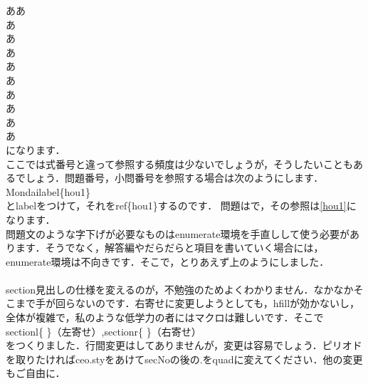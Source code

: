 \documentclass [10pt,fleqn,b5paper]{jsarticlek}
\begin{document}
\Mondai ああ\\
\Katakana あ\\
\Katakana あ\\
\Shikaku あ\\
\Shikakub あ\\
\Kuro あ\\
\Tokeiko あ\\
\Tokeidai あ\\
\Kakukakko あ\\
\Kakukakkob あ\\
になります．\\
ここでは式番号と違って参照する頻度は少ないでしょうが，そうしたいこともあるでしょう．問題番号，小問番号を参照する場合は次のようにします．\\
\yy Mondai\Kl \yy label\{hou1\}\Kr\\
とlabelをつけて，それを\yy ref\{hou1\}するのです．
問題は\Mondai[\label{hou1}]で，その参照は\ref{hou1}になります．\\

問題文のような字下げが必要なものはenumerate環境を手直しして使う必要があります．そうでなく，解答編やだらだらと項目を書いていく場合には，enumerate環境は不向きです．そこで，とりあえず上のようにしました．
\\
\\
section見出しの仕様を変えるのが，不勉強のためよくわかりません．なかなかそこまで手が回らないのです．右寄せに変更しようとしても，hfillが効かないし，全体が複雑で，私のような低学力の者にはマクロは難しいです．そこで\\
sectionl\{ \}（左寄せ）,sectionr\{ \}（右寄せ）\\
をつくりました．行間変更はしてありませんが，変更は容易でしょう．ピリオドを取りたければceo.styをあけてsecNoの後の.を\yy quadに変えてください．他の変更もご自由に．
\\
\\
 
\end{document}
